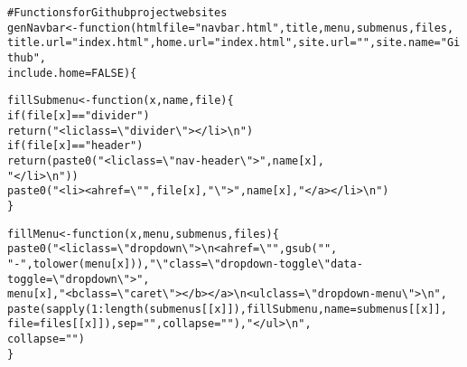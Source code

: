 \documentclass{article}\usepackage[]{graphicx}\usepackage[]{color}
\makeatletter
\newcommand{\hlnum}[1]{\textcolor[rgb]{0.863,0.196,0.184}{#1}}%
\newcommand{\hlstr}[1]{\textcolor[rgb]{0.863,0.196,0.184}{#1}}%
\newcommand{\hlcom}[1]{\textcolor[rgb]{0.345,0.431,0.459}{#1}}%
\newcommand{\hlopt}[1]{\textcolor[rgb]{0.576,0.631,0.631}{#1}}%
\newcommand{\hlstd}[1]{\textcolor[rgb]{0.514,0.58,0.588}{#1}}%
\newcommand{\hlkwa}[1]{\textcolor[rgb]{0.796,0.294,0.086}{#1}}%
\newcommand{\hlkwb}[1]{\textcolor[rgb]{0.522,0.6,0}{#1}}%
\newcommand{\hlkwc}[1]{\textcolor[rgb]{0.796,0.294,0.086}{#1}}%
\newcommand{\hlkwd}[1]{\textcolor[rgb]{0.576,0.631,0.631}{#1}}%
\newenvironment{kframe}{%
 \def\at@end@of@kframe{}%
 \ifinner\ifhmode%
  \def\at@end@of@kframe{\end{minipage}}%
  \begin{minipage}{\columnwidth}%
 \fi\fi%
 \def\FrameCommand##1{\hskip\@totalleftmargin \hskip-\fboxsep
 \colorbox{shadecolor}{##1}\hskip-\fboxsep
     \hskip-\linewidth \hskip-\@totalleftmargin \hskip\columnwidth}%
 \MakeFramed {\advance\hsize-\width
   \@totalleftmargin\z@ \linewidth\hsize
   \@setminipage}}%
 {\par\unskip\endMakeFramed%
 \at@end@of@kframe}
\newenvironment{knitrout}{}{} %
\makeatother
\begin{document}
\begin{knitrout}
\color{fgcolor}\begin{kframe}
\begin{alltt}
\hlcom{# Functions for Github project websites}
\hlstd{genNavbar} \hlkwb{<-} \hlkwa{function}\hlstd{(}\hlkwc{htmlfile} \hlstd{=} \hlstr{"navbar.html"}\hlstd{,} \hlkwc{title}\hlstd{,} \hlkwc{menu}\hlstd{,} \hlkwc{submenus}\hlstd{,} \hlkwc{files}\hlstd{,}
    \hlkwc{title.url} \hlstd{=} \hlstr{"index.html"}\hlstd{,} \hlkwc{home.url} \hlstd{=} \hlstr{"index.html"}\hlstd{,} \hlkwc{site.url} \hlstd{=} \hlstr{""}\hlstd{,} \hlkwc{site.name} \hlstd{=} \hlstr{"Github"}\hlstd{,}
    \hlkwc{include.home} \hlstd{=} \hlnum{FALSE}\hlstd{) \{}

    \hlstd{fillSubmenu} \hlkwb{<-} \hlkwa{function}\hlstd{(}\hlkwc{x}\hlstd{,} \hlkwc{name}\hlstd{,} \hlkwc{file}\hlstd{) \{}
        \hlkwa{if} \hlstd{(file[x]} \hlopt{==} \hlstr{"divider"}\hlstd{)}
            \hlkwd{return}\hlstd{(}\hlstr{"              <li class=\textbackslash{}"divider\textbackslash{}"></li>\textbackslash{}n"}\hlstd{)}
        \hlkwa{if} \hlstd{(file[x]} \hlopt{==} \hlstr{"header"}\hlstd{)}
            \hlkwd{return}\hlstd{(}\hlkwd{paste0}\hlstd{(}\hlstr{"              <li class=\textbackslash{}"nav-header\textbackslash{}">"}\hlstd{, name[x],}
                \hlstr{"</li>\textbackslash{}n"}\hlstd{))}
        \hlkwd{paste0}\hlstd{(}\hlstr{"              <li><a href=\textbackslash{}""}\hlstd{, file[x],} \hlstr{"\textbackslash{}">"}\hlstd{, name[x],} \hlstr{"</a></li>\textbackslash{}n"}\hlstd{)}
    \hlstd{\}}

    \hlstd{fillMenu} \hlkwb{<-} \hlkwa{function}\hlstd{(}\hlkwc{x}\hlstd{,} \hlkwc{menu}\hlstd{,} \hlkwc{submenus}\hlstd{,} \hlkwc{files}\hlstd{) \{}
        \hlkwd{paste0}\hlstd{(}\hlstr{"<li class=\textbackslash{}"dropdown\textbackslash{}">\textbackslash{}n            <a href=\textbackslash{}""}\hlstd{,} \hlkwd{gsub}\hlstd{(}\hlstr{" "}\hlstd{,}
            \hlstr{"-"}\hlstd{,} \hlkwd{tolower}\hlstd{(menu[x])),} \hlstr{"\textbackslash{}" class=\textbackslash{}"dropdown-toggle\textbackslash{}" data-toggle=\textbackslash{}"dropdown\textbackslash{}">"}\hlstd{,}
            \hlstd{menu[x],} \hlstr{" <b class=\textbackslash{}"caret\textbackslash{}"></b></a>\textbackslash{}n            <ul class=\textbackslash{}"dropdown-menu\textbackslash{}">\textbackslash{}n"}\hlstd{,}
            \hlkwd{paste}\hlstd{(}\hlkwd{sapply}\hlstd{(}\hlnum{1}\hlopt{:}\hlkwd{length}\hlstd{(submenus[[x]]), fillSubmenu,} \hlkwc{name} \hlstd{= submenus[[x]],}
                \hlkwc{file} \hlstd{= files[[x]]),} \hlkwc{sep} \hlstd{=} \hlstr{""}\hlstd{,} \hlkwc{collapse} \hlstd{=} \hlstr{""}\hlstd{),} \hlstr{"            </ul>\textbackslash{}n"}\hlstd{,}
            \hlkwc{collapse} \hlstd{=} \hlstr{""}\hlstd{)}
    \hlstd{\}}


\end{alltt}
\end{kframe}
\end{knitrout}
\end{document}
